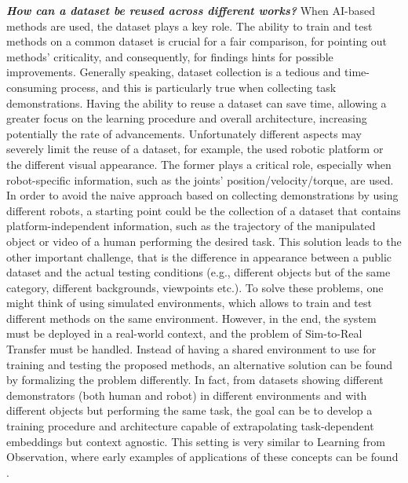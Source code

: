 \newline \textbf{\textit{How can a dataset be reused across different works?}} When AI-based methods are used, the dataset plays a key role. The ability to train and test methods on a common dataset is crucial for a fair comparison, for pointing out methods' criticality, and consequently, for findings hints for possible improvements. Generally speaking, dataset collection is a tedious and time-consuming process, and this is particularly true when collecting task demonstrations. Having the ability to reuse a dataset can save time, allowing a greater focus on the learning procedure and overall architecture, increasing potentially the rate of advancements. Unfortunately different aspects may severely limit the reuse of a dataset, for example, the used robotic platform or the different visual appearance. The former plays a critical role, especially when robot-specific information, such as the joints' position/velocity/torque, are used. %
In order to avoid the naive approach based on collecting demonstrations by using different robots, a starting point could be the collection of a dataset that contains platform-independent information, such as the trajectory of the manipulated object or video of a human performing the desired task. This solution leads to the other important challenge, that is the difference in appearance between a public dataset and the actual testing conditions (e.g., different objects but of the same category, different backgrounds, viewpoints etc.). To solve these problems, one might think of using simulated environments, which allows to train and test different methods on the same environment. However, in the end, the system must be deployed in a real-world context, and the problem of Sim-to-Real Transfer must be handled. Instead of having a shared environment to use for training and testing the proposed methods, an alternative solution can be found by formalizing the problem differently. In fact, from datasets showing different demonstrators (both human and robot) in different environments and with different objects but performing the same task, the goal can be to develop a training procedure and architecture capable of extrapolating task-dependent embeddings but context agnostic. This setting is very similar to Learning from Observation, where early examples of applications of these concepts can be found \cite{sermanet2018time_contrastive,zakka2022xirl}.
